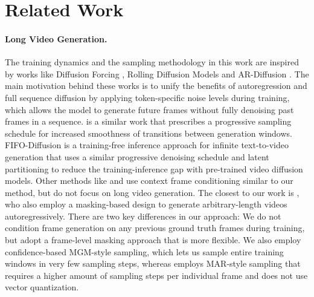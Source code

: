 \section{Related Work}

\paragraph{Long Video Generation.} 
The training dynamics and the sampling methodology in this work are inspired by works like Diffusion Forcing \cite{chen2024diffusionforcing,song2025historyguidedvideodiffusion}, Rolling Diffusion Models \cite{ruhe2024rollingdiffusionmodels} and AR-Diffusion \cite{wu2023ar}. The main motivation behind these works is to unify the benefits of autoregression and full sequence diffusion by applying token-specific noise levels during training, which allows the model to generate future frames without fully denoising past frames in a sequence. \citet{xie2024progressive} is a similar work that prescribes a progressive sampling schedule for increased smoothness of transitions between generation windows. FIFO-Diffusion is a training-free inference approach for infinite text-to-video generation that uses a similar progressive denoising schedule and latent partitioning to reduce the training-inference gap with pre-trained video diffusion models. Other methods like \cite{gao2024vid, zheng2024open} and \cite{blattmann2023stable} use context frame conditioning similar to our method, but do not focus on long video generation. The closest to our work is \citet{zhou2025taming}, who also employ a masking-based design to generate arbitrary-length videos autoregressively. There are two key differences in our approach: We do not condition frame generation on any previous ground truth frames during training, but adopt a frame-level masking approach that is more flexible. We also employ confidence-based MGM-style sampling, which lets us sample entire training windows in very few sampling steps, whereas \citet{zhou2025taming} employs MAR-style \cite{li2024autoregressive} sampling that requires a higher amount of sampling steps per individual frame and does not use vector quantization.
\vspace{-10pt}

